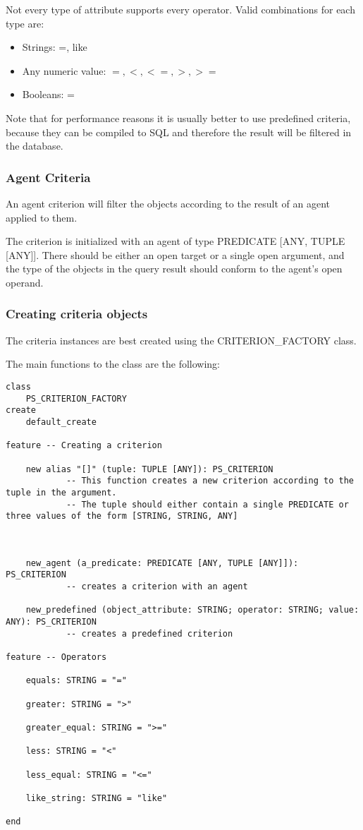 Not every type of attribute supports every operator. Valid combinations for each type are:

 \begin{itemize}
  \item Strings: =, like
  \item Any numeric value: $=, <, <=, >, >=$
  \item Booleans: =
 \end{itemize}

Note that for performance reasons it is usually better to use predefined criteria, because they can be compiled to SQL and therefore the result will be filtered in the database.

\subsubsection{Agent Criteria}

An agent criterion will filter the objects according to the result of an agent applied to them.

The criterion is initialized with an agent of type PREDICATE [ANY, TUPLE [ANY]]. 
There should be either an open target or a single open argument, and the type of the objects in the query result should conform to the agent's open operand.


\subsubsection{Creating criteria objects}

The criteria instances are best created using the CRITERION\_FACTORY class.

The main functions to the class are the following: 

\begin{lstlisting}[language=OOSC2Eiffel, captionpos=b, caption={The CRITERION\_FACTORY interface}, label={lst:factory_interface}]
class
	PS_CRITERION_FACTORY
create
	default_create

feature -- Creating a criterion

	new alias "[]" (tuple: TUPLE [ANY]): PS_CRITERION
			-- This function creates a new criterion according to the tuple in the argument.
			-- The tuple should either contain a single PREDICATE or three values of the form [STRING, STRING, ANY]



	new_agent (a_predicate: PREDICATE [ANY, TUPLE [ANY]]): PS_CRITERION
			-- creates a criterion with an agent

	new_predefined (object_attribute: STRING; operator: STRING; value: ANY): PS_CRITERION
			-- creates a predefined criterion

feature -- Operators

	equals: STRING = "="

	greater: STRING = ">"

	greater_equal: STRING = ">="

	less: STRING = "<"

	less_equal: STRING = "<="

	like_string: STRING = "like"

end
\end{lstlisting}

